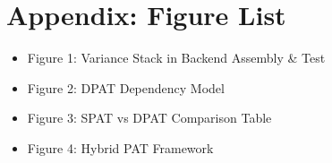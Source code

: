 \documentclass[11pt,a4paper]{article}
\begin{document}
	\section*{Appendix: Figure List}
	\begin{itemize}[leftmargin=1.2em]
		\item Figure 1: Variance Stack in Backend Assembly \& Test
		\item Figure 2: DPAT Dependency Model
		\item Figure 3: SPAT vs DPAT Comparison Table
		\item Figure 4: Hybrid PAT Framework
	\end{itemize}
	
\end{document}
